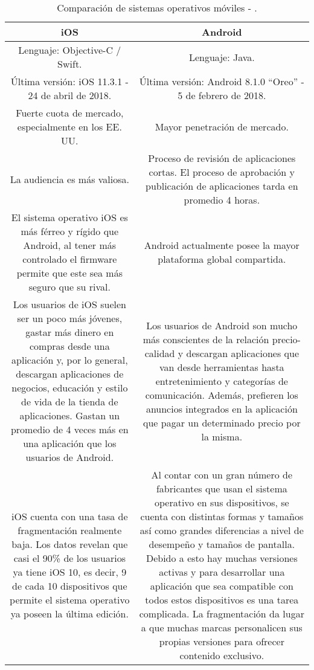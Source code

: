 \FloatBarrier
\begin{table}[htb]
\setlength\extrarowheight{2pt} %
\begin{tabularx}{\textwidth}{|C|C|}
\hline
\textbf{iOS} & \textbf{Android} 
\\ \hline
Lenguaje: Objective-C / Swift.  &  Lenguaje: Java.
\\ \hline
Última versión:	iOS 11.3.1 - 24 de abril de 2018. & Última versión: Android 8.1.0 ``Oreo'' - 5 de febrero de 2018.
\\ \hline
Fuerte cuota de mercado, especialmente en los EE. UU. & Mayor penetración de mercado.
\\ \hline
La audiencia es más valiosa. & Proceso de revisión de aplicaciones cortas. El proceso de aprobación y publicación de aplicaciones tarda en promedio 4 horas.
\\ \hline
El sistema operativo iOS es más férreo y rígido que Android, al tener más controlado el firmware permite que este sea más seguro que su rival. & Android actualmente posee la mayor plataforma global compartida.
\\ \hline
Los usuarios de iOS suelen ser un poco más jóvenes, gastar más dinero en compras desde una aplicación y, por lo general, descargan aplicaciones de negocios, educación y estilo de vida de la tienda de aplicaciones. Gastan un promedio de 4 veces más en una aplicación que los usuarios de Android. & Los usuarios de Android son mucho más conscientes de la relación precio-calidad y descargan aplicaciones que van desde herramientas hasta entretenimiento y categorías de comunicación. Además, prefieren los anuncios integrados en la aplicación que pagar un determinado precio por la misma.
\\ \hline
iOS cuenta con una tasa de fragmentación realmente baja. Los datos revelan que casi el 90\% de los usuarios ya tiene iOS 10, es decir, 9 de cada 10 dispositivos que permite el sistema operativo ya poseen la última edición. & Al contar con un gran número de fabricantes que usan el sistema operativo en sus dispositivos, se cuenta con distintas formas y tamaños así como grandes diferencias a nivel de desempeño y tamaños de pantalla. Debido a esto hay muchas versiones activas y para desarrollar una aplicación que sea compatible con todos estos dispositivos es una tarea complicada. La fragmentación da lugar a que muchas marcas personalicen sus propias versiones para ofrecer contenido exclusivo. 
\\ \hline
\end{tabularx}
\caption{Comparación de sistemas operativos móviles \cite{SOMovil1} - \cite{SOMovil5}. }
\label{table:comparacion-soMovil}
\end{table}
\FloatBarrier

